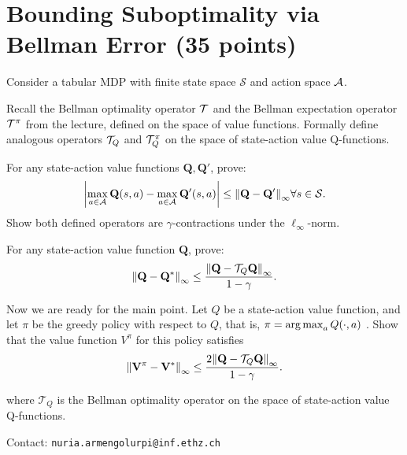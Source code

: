 \section{Bounding Suboptimality via Bellman Error (35 points)}
Consider a tabular MDP with finite state space $\mathcal{S}$ and action space $\mathcal{A}$. 
\begin{questions}

\question[10] 
Recall the Bellman optimality operator $\mathcal{T}$ and the Bellman expectation operator $\mathcal{T}^\pi$ from the lecture, defined on the space of value functions.
Formally define analogous operators $\mathcal{T}_Q$ and $\mathcal{T}^\pi_Q$ on the space of state-action value Q-functions.


\question[10] For any state-action value functions $\mathbf{Q}, \mathbf{Q}'$, prove:
\begin{align*}
    \abs {\max_{a \in \mathcal{A} } \mathbf{Q}(s,a) - \max_{a \in \mathcal{A} }\mathbf{Q}'(s,a)} \le \norm{\mathbf{Q} - \mathbf{Q}'}_\infty \forall s \in \mathcal{S}.
\end{align*}
Show both defined operators are $\gamma$-contractions under the $\ell_\infty$-norm.

\question[5]
For any state-action value function $\mathbf{Q}$, prove:
\begin{align*}
    \norm{\mathbf{Q} - \mathbf{Q}^{*}}_\infty \leq  \frac{\norm{\mathbf{Q} - \mathcal{T}_Q \mathbf{Q}}_\infty}{1-\gamma} .
\end{align*}

\question[10] 
 Now we are ready for the main point. Let $Q$ be a state-action value function, and let $\pi$ be the greedy policy with respect to $Q$, that is, $\pi = \operatorname*{arg\,max}_a Q(\cdot, a)$ .
 Show that the value function  $V^\pi$ for this policy satisfies
\begin{align*}
   \norm{\mathbf{V}^{\pi} - \mathbf{V}^{*}}_\infty \leq \frac{2\norm{\mathbf{Q} - \mathcal{T}_Q\mathbf{Q}}_\infty}{1-\gamma}.
\end{align*}

where $\mathcal{T}_Q$ is the Bellman optimality operator on the space of state-action value Q-functions.
\end{questions}

Contact: \texttt{nuria.armengolurpi@inf.ethz.ch}

